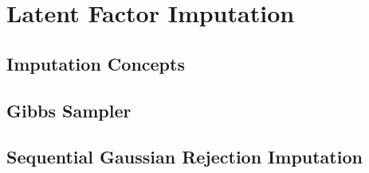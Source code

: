 
\chapter{Latent Factor Imputation}
\label{ch:impute}

\section{Imputation Concepts}
\label{sec:impute}

\section{Gibbs Sampler}
\label{sec:gibbs}

\section{Sequential Gaussian Rejection Imputation}
\label{sec:sgri}